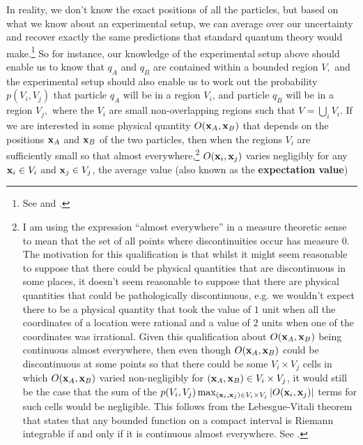 In reality, we don't know the exact positions of all the particles, but based on what we know about an experimental setup, we can average over our uncertainty and recover exactly the same predictions that standard quantum theory would make.\footnote{See \cite{BohmDavid1952A} and \cite{BohmDavid1952B}.} So for instance, our knowledge of the experimental setup above should enable us  to know that $q_A$ and $q_B$ are contained within a bounded region $V,$ %
%
and the experimental setup should also enable us to work out the probability  $p(V_i, V_j)$ %
%
that particle $q_A$  will be in a region $V_i$, and particle $q_B$ will be in a region $V_j,$ where the $V_i$ are small non-overlapping regions such that $V=\bigcup_iV_i$. %
%
If we are interested in some physical quantity $O(\vb{x}_A, \vb{x}_B)$ %
%
that depends on the positions $\vb{x}_A$ and $\vb{x}_B$ of the two particles, then when the regions $V_i$ are  sufficiently small so that almost everywhere,\footnote{I am using the expression ``almost everywhere'' in a measure theoretic sense to mean that the set of all points where discontinuities occur has measure $0$. The motivation for this qualification is that whilst it might seem reasonable to suppose that there could be physical quantities that are discontinuous in some places, it doesn't seem reasonable to suppose that there are physical quantities that could be pathologically discontinuous, e.g. we wouldn't expect there to be a physical quantity that took the value of $1$ unit when all the coordinates of a location were rational and a value of $2$ units when one of the coordinates was irrational. Given this qualification about $O(\vb{x}_A,\vb{x}_B)$ being continuous almost everywhere, then even though $O(\vb{x}_A,\vb{x}_B)$ could be discontinuous at some points so that there could be some  $V_i\times V_j$ cells in which $O(\vb{x}_A,\vb{x}_B)$ varied non-negligibly for $(\vb{x}_A,\vb{x}_B)\in V_i\times V_j$, it would still be the case that the sum of the $p(V_i, V_j)\max_{(\vb{x}_i,\vb{x}_j)\in V_i\times V_j}|O(\vb{x}_i,\vb{x}_j)|$ terms for such cells would be negligible. This follows from the Lebesgue-Vitali theorem that states that any bounded function on a compact interval is Riemann integrable if and only if it is continuous almost everywhere. See \cite{wiki:Riemann}.} $O(\vb{x}_i, \vb{x}_j)$ varies negligibly for any $\vb{x}_i\in V_i$ and $\vb{x}_j\in V_j$,  the average value (also known as the \textbf{expectation value})
